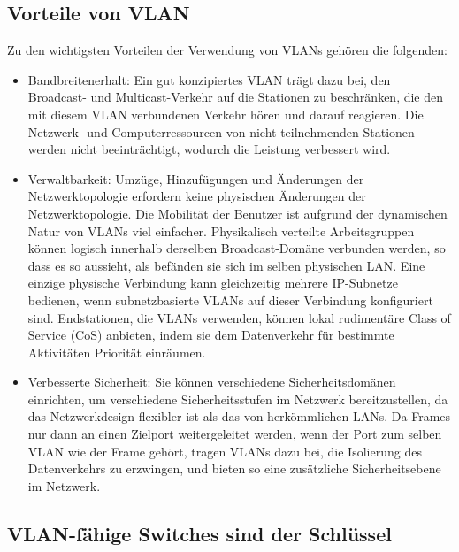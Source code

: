         \subsection{Vorteile von VLAN}
        Zu den wichtigsten Vorteilen der Verwendung von VLANs gehören die folgenden:
        \begin{itemize}
            \item Bandbreitenerhalt: Ein gut konzipiertes VLAN trägt dazu bei, den Broadcast- und Multicast-Verkehr auf die Stationen zu beschränken, die den mit diesem VLAN verbundenen Verkehr hören und darauf reagieren. Die Netzwerk- und Computerressourcen von nicht teilnehmenden Stationen werden nicht beeinträchtigt, wodurch die Leistung verbessert wird.
            \item Verwaltbarkeit: Umzüge, Hinzufügungen und Änderungen der Netzwerktopologie erfordern keine physischen Änderungen der Netzwerktopologie. Die Mobilität der Benutzer ist aufgrund der dynamischen Natur von VLANs viel einfacher. Physikalisch verteilte Arbeitsgruppen können logisch innerhalb derselben Broadcast-Domäne verbunden werden, so dass es so aussieht, als befänden sie sich im selben physischen LAN. Eine einzige physische Verbindung kann gleichzeitig mehrere IP-Subnetze bedienen, wenn subnetzbasierte VLANs auf dieser Verbindung konfiguriert sind. Endstationen, die VLANs verwenden, können lokal rudimentäre Class of Service (CoS) anbieten, indem sie dem Datenverkehr für bestimmte Aktivitäten Priorität einräumen.
            \item Verbesserte Sicherheit: Sie können verschiedene Sicherheitsdomänen einrichten, um verschiedene Sicherheitsstufen im Netzwerk bereitzustellen, da das Netzwerkdesign flexibler ist als das von herkömmlichen LANs. Da Frames nur dann an einen Zielport weitergeleitet werden, wenn der Port zum selben VLAN wie der Frame gehört, tragen VLANs dazu bei, die Isolierung des Datenverkehrs zu erzwingen, und bieten so eine zusätzliche Sicherheitsebene im Netzwerk.
        \end{itemize}

        \subsection{VLAN-fähige Switches sind der Schlüssel}


